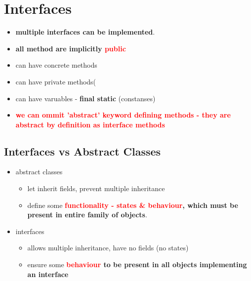 \documentclass{report}
\begin{document}
\chapter{Interfaces}
\begin{itemize}
	\item \textbf{multiple interfaces can be implemented}.
	\item \textbf{all method are implicitly \textcolor{red}{public}}
	\item can have concrete methods
	\item can have private methods(
	\item can have varuables - \textbf{final static} (constanses)
	\item \textbf{\textcolor{red}{we can ommit 'abstract' keyword defining methods - they are abstract by definition
	as interface methods}}
\end{itemize}

\section{Interfaces vs Abstract Classes}
\begin{itemize}
	\item abstract classes
	\begin{itemize}
		\item  let inherit fields, prevent multiple inheritance
		\item define some \textbf{\textcolor{red}{functionality - states \& behaviour}, which must be present in entire family of objects}.
	\end{itemize}
	\item interfaces
	\begin{itemize}
		\item  allows multiple inheritance, have no fields (no states)
		\item ensure some \textbf{\textcolor{red}{behaviour} to be present in all objects implementing an interface}
	\end{itemize}
	
\end{itemize}
\end{document}
